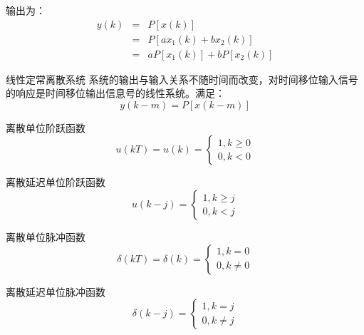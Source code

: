 \begin{frame}{}
\begin{block}{}
输出为：
\begin{eqnarray*}
y(k)&=&P[x(k)]\\
&=&P[ax_1(k)+bx_2(k)]\\
&=&aP[x_1(k)]+bP[x_2(k)]
\end{eqnarray*}
\end{block}
\end{frame}
\begin{frame}
\begin{block}{线性定常离散系统}
系统的输出与输入关系不随时间而改变，对时间移位输入信号的响应是时间移位输出信息号的线性系统。满足：
\[y(k-m)=P[x(k-m)]\] 
\end{block}
\end{frame}
\begin{frame}
\begin{block}{离散单位阶跃函数}
\begin{equation*}
u(kT)=u(k)=\begin{cases}
1,k\geq 0\\
0,k<0
\end{cases}
\end{equation*}
\end{block}
\begin{block}{离散延迟单位阶跃函数}
\begin{equation*}
u(k-j)=\begin{cases}
1,k\geq j\\
0,k<j
\end{cases}
\end{equation*}
\end{block}
\end{frame}

\begin{frame}
\begin{block}{离散单位脉冲函数}
\begin{equation*}
\delta(kT)=\delta(k)=\begin{cases}
1,k= 0\\
0,k\neq 0
\end{cases}
\end{equation*}
\end{block}
\begin{block}{离散延迟单位脉冲函数}
\begin{equation*}
\delta(k-j)=\begin{cases}
1,k= j\\
0,k\neq j
\end{cases}
\end{equation*}
\end{block}
\end{frame}

